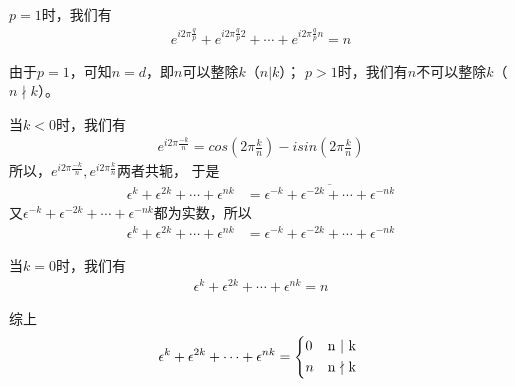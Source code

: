 \documentclass{article}
\begin{document}
$p = 1$时，我们有
\begin{align*}
  e^{i 2\pi \frac{q}{p}} + e^{i 2\pi \frac{q}{p} 2} + \cdots + e^{i 2\pi \frac{q}{p}n} = n
\end{align*}

由于$p = 1$，可知$n = d$，即$n$可以整除$k$（$n | k$）；
$p > 1$时，我们有$n$不可以整除$k$（$n \nmid k$）。

当$k < 0$时，我们有
\begin{align*}
  e^{i 2\pi \frac{-k}{n}} = cos (2\pi \frac{k}{n}) - i sin (2\pi \frac{k}{n})
\end{align*}
所以，$e^{i 2\pi \frac{-k}{n}}, e^{i 2\pi \frac{k}{n}}$两者共轭，
于是
\begin{align*}
  \epsilon^k + \epsilon^{2k} + \cdots + \epsilon^{nk} & = \overline{\epsilon^{-k} + \epsilon^{-2k} + \cdots + \epsilon^{-nk}}
\end{align*}
又$\epsilon^{-k} + \epsilon^{-2k} + \cdots + \epsilon^{-nk}$都为实数，所以
\begin{align*}
  \epsilon^k + \epsilon^{2k} + \cdots + \epsilon^{nk} & = \epsilon^{-k} + \epsilon^{-2k} + \cdots + \epsilon^{-nk}
\end{align*}

当$k = 0$时，我们有
\begin{align*}
  \epsilon^k + \epsilon^{2k} + \cdots + \epsilon^{nk} = n
\end{align*}

综上
\begin{equation*}
  \epsilon^k + \epsilon^{2k} + \cdots + \epsilon^{nk} = \begin{cases*}
    0 & n | k     \\
    n & n $\nmid$ k
  \end{cases*}
\end{equation*}
\end{document}
